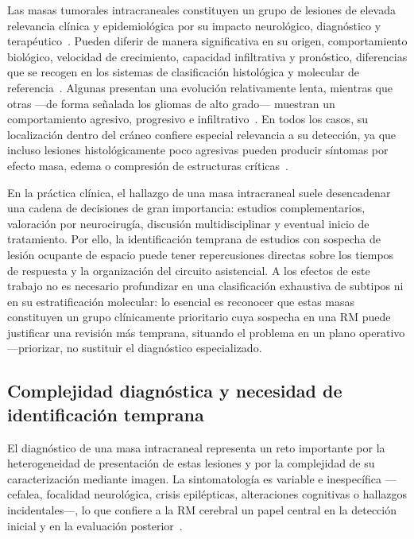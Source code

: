 Las masas tumorales intracraneales constituyen un grupo de lesiones de elevada
relevancia clínica y epidemiológica por su impacto neurológico, diagnóstico y
terapéutico~\cite{ostrom2023cbtrus,mcneill2016epidemiology}. Pueden diferir de
manera significativa en su origen, comportamiento biológico, velocidad de
crecimiento, capacidad infiltrativa y pronóstico, diferencias que se recogen en
los sistemas de clasificación histológica y molecular de referencia~\cite{louis2021who,who2007cns,kleihues2000who}.
Algunas presentan una evolución relativamente lenta, mientras que otras ---de
forma señalada los gliomas de alto grado--- muestran un comportamiento agresivo,
progresivo e infiltrativo~\cite{wen2008gliomas}. En todos los casos, su
localización dentro del cráneo confiere especial relevancia a su detección, ya
que incluso lesiones histológicamente poco agresivas pueden producir síntomas por
efecto masa, edema o compresión de estructuras críticas~\cite{contreras2017epidemiologia,perezsegura2025tumores}.

En la práctica clínica, el hallazgo de una masa intracraneal suele desencadenar
una cadena de decisiones de gran importancia: estudios complementarios,
valoración por neurocirugía, discusión multidisciplinar y eventual inicio de
tratamiento. Por ello, la identificación temprana de estudios con sospecha de
lesión ocupante de espacio puede tener repercusiones directas sobre los tiempos
de respuesta y la organización del circuito asistencial. A los efectos de este
trabajo no es necesario profundizar en una clasificación exhaustiva de subtipos
ni en su estratificación molecular: lo esencial es reconocer que estas masas
constituyen un grupo clínicamente prioritario cuya sospecha en una RM puede
justificar una revisión más temprana, situando el problema en un plano operativo
---priorizar, no sustituir el diagnóstico especializado.

\subsection{Complejidad diagnóstica y necesidad de identificación temprana}

El diagnóstico de una masa intracraneal representa un reto importante por la
heterogeneidad de presentación de estas lesiones y por la complejidad de su
caracterización mediante imagen. La sintomatología es variable e inespecífica
---cefalea, focalidad neurológica, crisis epilépticas, alteraciones cognitivas o
hallazgos incidentales---, lo que confiere a la RM cerebral un papel central en
la detección inicial y en la evaluación posterior~\cite{cha2009neuroimaging}.

